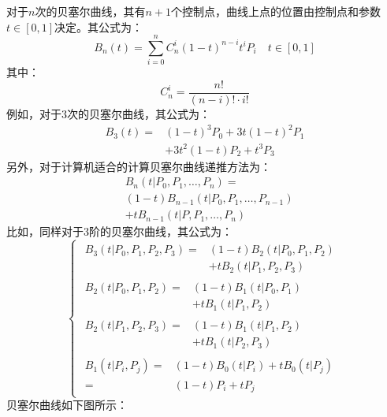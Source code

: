 \documentclass[12pt, twocolumn]{article}
\begin{document}
	对于$n$次的贝塞尔曲线，其有$n+1$个控制点，曲线上点的位置由控制点和参数$t\in[0,1]$决定。其公式为：
	\begin{equation*}
		B_n(t)=\sum_{i=0}^{n}C_{n}^{i}(1-t)^{n-i}t^{i}P_{i}\quad t\in[0,1]
	\end{equation*}
	其中：
	\begin{equation*}
		C_{n}^{i}=\frac{n!}{(n-i)!\cdot i!}
	\end{equation*}
	例如，对于3次的贝塞尔曲线，其公式为：
	\begin{equation*}
		\begin{aligned}
			B_3(t)=&(1-t)^3P_0+3t(1-t)^2P_1\\&+3t^2(1-t)P_2+t^3P_3
		\end{aligned}
	\end{equation*}
另外，对于计算机适合的计算贝塞尔曲线递推方法为：
\begin{equation*}
	\begin{aligned}
			&B_n(t|P_0,P_1,\dots,P_n)=\\&(1-t)B_{n-1}(t|P_0,P_1,\dots,P_{n-1})\\
			&+tB_{n-1}(t|P,P_1,\dots,P_n)
	\end{aligned}
\end{equation*}
比如，同样对于3阶的贝塞尔曲线，其公式为：
\begin{equation*}
	\begin{cases}
		\begin{aligned}
			B_3(t|P_0,P_1,P_2,P_3)=&(1-t)B_2(t|P_0,P_1,P_2)\\&+tB_2(t|P_1,P_2,P_3)
		\end{aligned}\\
		\begin{aligned}
		B_2(t|P_0,P_1,P_2)=&(1-t)B_1(t|P_0,P_1)\\&+tB_1(t|P_1,P_2)
		\end{aligned}\\
	\begin{aligned}
	B_2(t|P_1,P_2,P_3)=&(1-t)B_1(t|P_1,P_2)\\&+tB_1(t|P_2,P_3)
	\end{aligned}\\
	\begin{aligned}
	B_1(t|P_i,P_j)=&(1-t)B_0(t|P_i)+tB_0(t|P_j)\\
	=&(1-t)P_i+tP_j
	\end{aligned}
	\end{cases}
\end{equation*}
贝塞尔曲线如下图所示：
\end{document}

